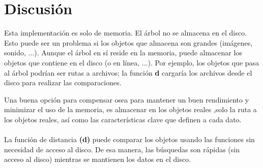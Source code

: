 \documentclass[a4paper]{article}
\begin{document}
\section{Discusión}

Esta implementación es solo de memoria. El árbol no se almacena en el disco. Esto puede ser un problema si los objetos que almacena son grandes (imágenes, sonido, ...). Aunque el árbol en sí reside en la memoria, puede almacenar los objetos que contiene en el disco (o en línea, ...). Por ejemplo, los objetos que pasa al árbol podrían ser rutas a archivos; la función \textbf{d} cargaría los archivos desde el disco para realizar las comparaciones.

Una buena opción para compensar osea  para mantener un buen rendimiento y minimizar el uso de la memoria,  es almacenar en los objetos reales  ,solo  la ruta  a los objetos  reales, así como las características clave que definen a cada dato. 
\\
\\
La función de distancia \textbf{(d)} puede comparar los objetos usando las funciones sin necesidad de acceso al disco. De esa manera, las búsquedas son rápidas (sin acceso al disco) mientras se mantienen los datos en el disco\cite{repositorio}.



\end{document}
